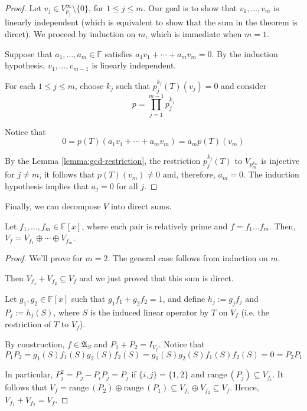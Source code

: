 \begin{proof}
	Let $v_j \in V_{p_j}^\infty \setminus \{ 0 \}$, for $1 \leq j \leq m$. Our goal is to show that $v_1, \ldots, v_m$ is linearly independent (which is equivalent to show that the sum in the theorem is direct). We proceed by induction on $m$, which is immediate when $m = 1$. 

	Suppose that $a_1, \ldots, a_m \in \mathbb{F}$ satisfies $a_1 v_1 + \cdots + a_m v_m = 0$. By the induction hypothesis, $v_1, \ldots, v_{m-1}$ is linearly independent. 

	For each $1 \leq j \leq m$, choose $k_j$ such that $p_j^{k_j}(T)(v_j) = 0$ and consider 
	\[
		p = \prod_{j=1}^{m-1} p_j^{k_j}
	\]

	Notice that 
	\[
		0 = p(T)(a_1 v_1 + \cdots + a_m v_m) = a_m p(T)(v_m)
	\]

	By the Lemma \ref{lemma:gcd-restriction}, the restriction $p_j^{k_j}(T)$ to $V_{p_m^{k_m}}$ is injective for $j \neq m$, it follows that $p(T)(v_m) \neq 0$ and, therefore, $a_m = 0$. The induction hypothesis implies that $a_j = 0$ for all $j$.
\end{proof}

Finally, we can decompose $V$ into direct sums.

\begin{theorem}
	Let $f_1, \ldots, f_m \in \mathbb{F}[x]$, where each pair is relatively prime and $f = f_1 \ldots f_m$. Then, $V_f = V_{f_1} \oplus \cdots \oplus V_{f_m}$.
\end{theorem}

\begin{proof}
	We'll prove for $m = 2$. The general case follows from induction on $m$.

	Then $V_{f_1} + V_{f_2} \subseteq V_f$ and we just proved that this sum is direct.

	Let $g_1, g_2 \in \mathbb{F}[x]$ such that $g_1 f_1 + g_2 f_2 = 1$, and define $h_j := g_j f_j$ and $P_j := h_j(S)$, where $S$ is the induced linear operator by $T$ on $V_f$ (i.e. the restriction of $T$ to $V_f$). 

	By construction, $f \in \mathfrak{A}_S$ and $P_1 + P_2 = I_{V_f}$. Notice that
	\[
		P_1 P_2 = g_1(S)f_1(S)g_2(S)f_2(S) = g_1(S)g_2(S)f_1(S)f_2(S) = 0 = P_2 P_1
	\]

	In particular, $P_j^2 = P_j - P_i P_j = P_j$ if $\{ i, j \} = \{ 1, 2 \}$ and $\text{range}~(P_j) \subseteq V_{f_i}$. It follows that $V_f = \text{range}~(P_2) \oplus \text{range}~(P_1) \subseteq V_{f_1} \oplus V_{f_2} \subseteq V_f$. Hence, $V_{f_1} + V_{f_2} = V_f$.
\end{proof}

